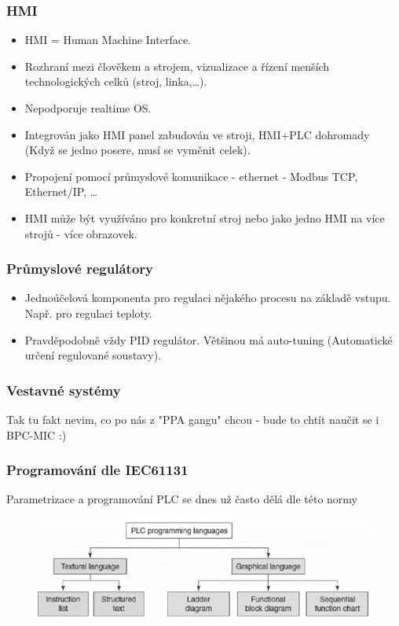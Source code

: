 \begin{itemize}
\subsubsection*{HMI}
\begin{itemize}
  \item HMI = Human Machine Interface.
  \item Rozhraní mezi člověkem a strojem, vizualizace a řízení menších technologických celků (stroj, linka,\dots).
  \item Nepodporuje realtime OS.
  \item Integrován jako HMI panel zabudován ve stroji, HMI+PLC dohromady (Když se jedno posere, musí se vyměnit celek).
  \item Propojení pomocí průmyslové komunikace - ethernet - Modbus TCP, Ethernet/IP, \dots
  \item HMI může být využíváno pro konkretní stroj nebo jako jedno HMI na více strojů - více obrazovek.
\end{itemize}

\subsubsection*{Průmyslové regulátory}
\begin{itemize}
  \item Jednoúčelová komponenta pro regulaci nějakého procesu na základě vstupu. Např. pro regulaci teploty.
  \item Pravděpodobně vždy PID regulátor. Většinou má auto-tuning (Automatické určení regulované soustavy).
\end{itemize}

\subsubsection*{Vestavné systémy}
Tak tu fakt nevim, co po nás z "PPA gangu" chcou - bude to chtít naučit se i BPC-MIC :)

\subsubsection*{Programování dle IEC61131}
Parametrizace a programování PLC se dnes už často dělá dle této normy

\begin{figure}[h]
  \begin{center}
    \includegraphics[scale = 1]{img/Picture14.png}
  \end{center}
\end{figure}


\end{itemize}
